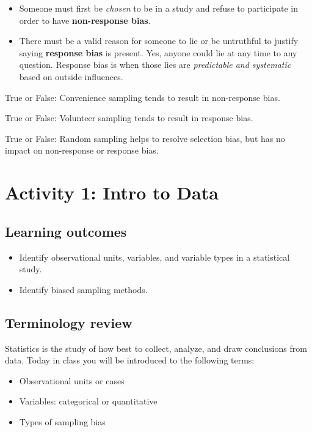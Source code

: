 \documentclass[
]{report}
\newcommand{\rgs}{\vspace{12pt}} %
\begin{document}
\begin{itemize}
\item
  Someone must first be \emph{chosen} to be in a study and refuse to participate in order to have \textbf{non-response bias}.
\item
  There must be a valid reason for someone to lie or be untruthful to justify saying \textbf{response bias} is present. Yes, anyone could lie at any time to any question. Response bias is when those lies are \emph{predictable and systematic} based on outside influences.
  \rgs
\end{itemize}

True or False: Convenience sampling tends to result in non-response bias.

True or False: Volunteer sampling tends to result in response bias.

True or False: Random sampling helps to resolve selection bias, but has no impact on non-response or response bias.

\newpage

\hypertarget{activity-1-intro-to-data}{%
\section{Activity 1: Intro to Data}\label{activity-1-intro-to-data}}


\hypertarget{learning-outcomes}{%
\subsection{Learning outcomes}\label{learning-outcomes}}

\begin{itemize}
\item
  Identify observational units, variables, and variable types in a statistical study.
\item
  Identify biased sampling methods.
\end{itemize}

\hypertarget{terminology-review}{%
\subsection{Terminology review}\label{terminology-review}}

Statistics is the study of how best to collect, analyze, and draw conclusions from data. Today in class you will be introduced to the following terms:

\begin{itemize}
\item
  Observational units or cases
\item
  Variables: categorical or quantitative
\item
  Types of sampling bias
\end{itemize}
\end{document}

